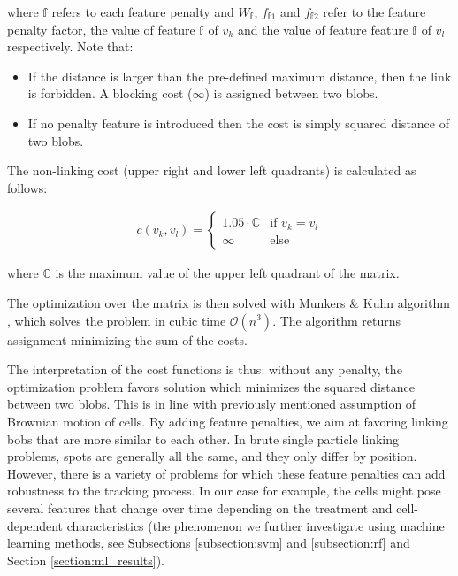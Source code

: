 \documentclass[pdftex,12pt,a4paper]{report}
\begin{document}
where $\mathbb{f}$ refers to each feature penalty and $W_{\mathbb{f}}$, $f_{\mathbb{f}1}$ and $f_{\mathbb{f}2}$ refer to the feature penalty factor, the value of feature $\mathbb{f}$ of $v_k$ and the value of feature feature $\mathbb{f}$ of $v_l$ respectively. Note that:

\begin{itemize}
\item If the distance is larger than the pre-defined maximum distance, then the link is forbidden. A blocking cost ($\infty$) is assigned between two blobs.
\item If no penalty feature is introduced then the cost is simply squared distance of two blobs.
\end{itemize}

The non-linking cost (upper right and lower left quadrants) is calculated as follows:

\begin{gather*}
c(v_k, v_l) =
\begin{cases}
  1.05 \cdot \mathbb{C} & \text{if } v_k = v_l \\
  \infty & \text{else}  
\end{cases}
\end{gather*}

where $\mathbb{C}$ is the maximum value of the upper left quadrant of the matrix.

The optimization over the matrix is then solved with Munkers \& Kuhn algorithm \cite{munkres1957algorithms}, which solves the problem in cubic time $\mathcal{O}(n^3)$. The algorithm returns assignment minimizing the sum of the costs.

The interpretation of the cost functions is thus: without any penalty, the optimization problem favors solution which minimizes the squared distance between two blobs. This is in line with previously mentioned assumption of Brownian motion of cells. By adding feature penalties, we aim at favoring linking bobs that are more similar to each other. In brute single particle linking problems, spots are generally all the same, and they only differ by position. However, there is a variety of problems for which these feature penalties can add robustness to the tracking process. In our case for example, the cells might pose several features that change over time depending on the treatment and cell-dependent characteristics (the phenomenon we further investigate using machine learning methods, see Subsections \ref{subsection:svm} and \ref{subsection:rf} and Section \ref{section:ml_results}).
\end{document}
